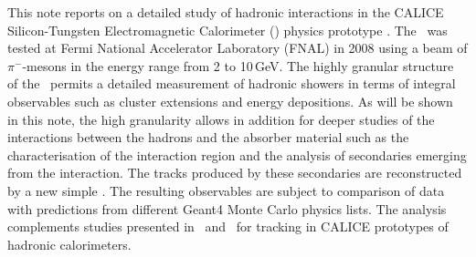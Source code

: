 This note reports on a detailed study of hadronic interactions in the CALICE Silicon-Tungsten Electromagnetic Calorimeter (\ecal) physics prototype \cite{Anduze:2008hq}.
The \ecal\ was tested at Fermi National Accelerator Laboratory (FNAL) in 2008 using a beam of $\pi^-$-mesons in the energy range from 2 to 10\,GeV. 
The highly granular structure of the \ecal\ permits a detailed measurement of hadronic showers in terms of integral observables \cite{Bilki:2014uep} such as cluster extensions and energy depositions. As will be shown in this note, the high granularity allows in addition for deeper studies of the interactions between the hadrons and the absorber material such as the characterisation of the interaction region and the analysis of secondaries emerging from the interaction. The tracks produced by these secondaries are reconstructed by a new simple \tfa . The resulting observables are subject to comparison of data with predictions from different {\sc Geant}4 Monte Carlo physics lists. The analysis complements studies presented in~\cite{Adloff:2013vra} and~\cite{bib:can-047} for tracking in CALICE prototypes of hadronic calorimeters.  




